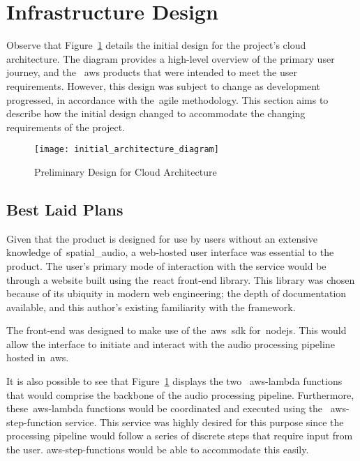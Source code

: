 \thispagestyle{plain}
\newpage
\section{Infrastructure Design}\label{sec:infrastructure-design}

\normalsize

Observe that Figure~\ref{fig:preliminary-design} details the initial design for the project's cloud architecture.
The diagram provides a high-level overview of the primary user journey,
and the ~\gls{aws} products that were intended to meet the user requirements.
However, this design was subject to change as development progressed, in accordance with the~\gls{agile} methodology.
This section aims to describe how the initial design changed to accommodate the changing requirements of the project.

\begin{figure}[!htb]
    \minipage{\textwidth}
    \texttt{[image: initial\_architecture\_diagram]}
    \caption{Preliminary Design for Cloud Architecture}\label{fig:preliminary-design}
    \endminipage\hfill
\end{figure}

\subsection{Best Laid Plans}\label{subsec:best-laid-plans}

Given that the product is designed for use by users without an extensive knowledge of~\gls{spatial_audio},
a web-hosted user interface was essential to the product.
The user’s primary mode of interaction with the service would be through a website
built using the~\gls{react} front-end library.
This library was chosen because of its ubiquity in modern web engineering; the depth of documentation available,
and this author’s existing familiarity with the framework.

The front-end was designed to make use of the~\gls{aws}~\gls{sdk} for~\gls{nodejs}.
This would allow the interface to initiate and interact with the audio processing pipeline hosted in~\gls{aws}.

It is also possible to see
that Figure~\ref{fig:preliminary-design} displays the two ~\gls{aws-lambda} functions
that would comprise the backbone of the audio processing pipeline.
Furthermore,
these~\gls{aws-lambda} functions would be coordinated and executed using the ~\gls{aws-step-function} service.
This service was highly desired for this purpose
since the processing pipeline would follow a series of discrete steps that require input from the user.
\glspl{aws-step-function} would be able to accommodate this easily.

